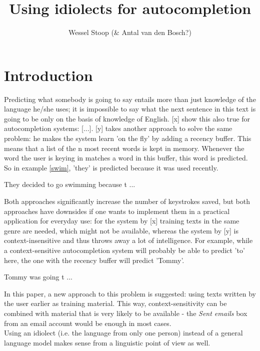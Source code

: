 \documentclass[12pt]{article}
\title{Using idiolects for autocompletion}
\author{Wessel Stoop (\& Antal van den Bosch?)}
\begin{document}
\maketitle

\section{Introduction}
Predicting what somebody is going to say entails more than just knowledge of the language he/she uses; it is impossible to say what the next sentence in this text is going to be only on the basis of knowledge of English. [x] show this also true for autocompletion systems: [...]. [y] takes another approach to solve the same problem: he makes the system learn 'on the fly' by adding a recency buffer. This means that a list of the n most recent words is kept in memory. Whenever the word the user is keying in matches a word in this buffer, this word is predicted. So in example \ref{swim}, 'they' is predicted because it was used recently.

\begin{examples} \label{swim}
\item They decided to go swimming because t ...
\end{examples}

Both approaches significantly increase the number of keystrokes saved, but both approaches have downsides if one wants to implement them in a practical application for everyday use: for the system by [x] training texts in the same genre are needed, which might not be available, whereas the system by [y] is context-insensitive and thus throws away a lot of intelligence. For example, while a context-sensitive autocompletion system will probably be able to predict 'to' here, the one with the recency buffer will predict 'Tommy'.

\begin{examples} \label{swim}
\item Tommy was going t ...
\end{examples}

In this paper, a new approach to this problem is suggested: using texts written by the user earlier as training material. This way, context-sensitivity can be combined with material that is very likely to be available - the \emph{Sent emails} box from an email account would be enough in most cases. \\\indent
Using an idiolect (i.e. the language from only one person) instead of a general language model makes sense from a linguistic point of view as well.
\end{document}
